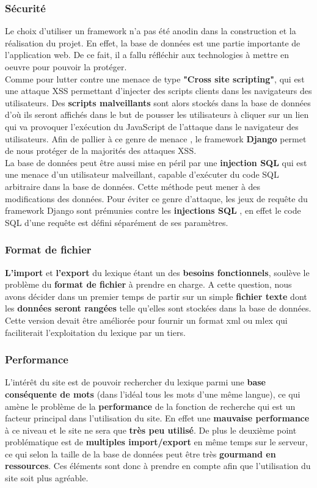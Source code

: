 \documentclass[a4paper, 12pt]{article}
\begin{document}
\subsubsection{Sécurité}
Le choix d'utiliser un framework n'a pas été anodin dans la construction et la réalisation du projet. En effet, la base de données est une partie importante de l'application web. De ce fait, il a fallu réfléchir aux technologies à mettre en oeuvre pour pouvoir la protéger. \\Comme pour lutter contre une menace de type  \textbf{"Cross site scripting"}, qui est une attaque XSS permettant d'injecter des scripts clients dans les navigateurs des utilisateurs. Des \textbf{scripts malveillants} sont alors stockés dans la base de données d'où ils seront affichés dans le but de pousser les utilisateurs à cliquer sur un lien qui va provoquer l'exécution du JavaScript de l'attaque dans le navigateur des utilisateurs. Afin de pallier à ce genre de menace , le framework  \textbf{Django} permet de nous protéger de la majorités des attaques XSS.\\
La base de données peut être aussi mise en péril par une   \textbf{injection SQL} qui est une menace d'un utilisateur malveillant, capable d'exécuter du code SQL arbitraire dans la base de données. Cette méthode peut mener à des modifications des données. Pour éviter ce genre d'attaque, les jeux de requête du framework Django sont prémunies contre les \textbf{injections SQL} , en effet le code SQL d'une requête est défini séparément de ses paramètres.

\subsubsection{Format de fichier}
\textbf{L'import} et \textbf{l'export} du lexique étant un des \textbf{besoins fonctionnels}, soulève le problème du \textbf{format de fichier} à prendre en charge. A cette question, nous avons décider  dans un premier temps de partir sur un simple \textbf{fichier texte} dont les \textbf{données seront rangées} telle qu'elles sont stockées dans la base de données. Cette version devait être améliorée pour fournir un format xml ou mlex qui faciliterait l'exploitation du lexique par un tiers. 
\subsubsection{Performance}
L'intérêt du site est de pouvoir rechercher du lexique parmi une \textbf{base conséquente de mots} (dans l'idéal tous les mots d'une même langue), ce qui amène le problème de la \textbf{performance} de la fonction de recherche qui est un facteur principal dans l'utilisation du site. En effet une \textbf{mauvaise performance} à ce niveau et le site ne sera que \textbf{très peu utilisé}. De plus le deuxième point problématique est de \textbf{multiples import/export} en même temps sur le serveur, ce qui selon la taille de la base de données peut être très \textbf{gourmand en ressources}. Ces éléments sont donc à prendre en compte afin que l'utilisation du site soit plus agréable.
\end{document}
